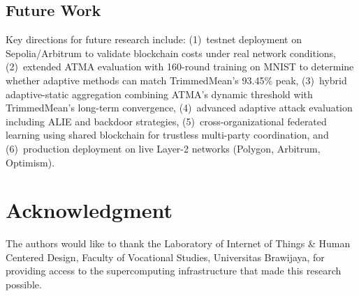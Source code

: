\documentclass[12pt,a4paper,onecolumn]{article}
\begin{document}
\subsection{Future Work}

Key directions for future research include: (1)~testnet deployment on Sepolia/Arbitrum to validate blockchain costs under real network conditions, (2)~extended ATMA evaluation with 160-round training on MNIST to determine whether adaptive methods can match TrimmedMean's 93.45\% peak, (3)~hybrid adaptive-static aggregation combining ATMA's dynamic threshold with TrimmedMean's long-term convergence, (4)~advanced adaptive attack evaluation including ALIE and backdoor strategies, (5)~cross-organizational federated learning using shared blockchain for trustless multi-party coordination, and (6)~production deployment on live Layer-2 networks (Polygon, Arbitrum, Optimism).

\section*{Acknowledgment}

The authors would like to thank the Laboratory of Internet of Things \& Human Centered Design, Faculty of Vocational Studies, Universitas Brawijaya, for providing access to the supercomputing infrastructure that made this research possible.
\end{document}
